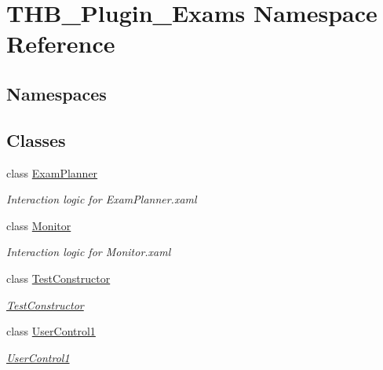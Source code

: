 \hypertarget{namespace_t_h_b___plugin___exams}{}\section{T\+H\+B\+\_\+\+Plugin\+\_\+\+Exams Namespace Reference}
\label{namespace_t_h_b___plugin___exams}
\subsection*{Namespaces}
\begin{DoxyCompactItemize}
\end{DoxyCompactItemize}
\subsection*{Classes}
\begin{DoxyCompactItemize}
\item 
class \mbox{\hyperlink{class_t_h_b___plugin___exams_1_1_exam_planner}{Exam\+Planner}}
\begin{DoxyCompactList}\small\item\em Interaction logic for Exam\+Planner.\+xaml \end{DoxyCompactList}\item 
class \mbox{\hyperlink{class_t_h_b___plugin___exams_1_1_monitor}{Monitor}}
\begin{DoxyCompactList}\small\item\em Interaction logic for Monitor.\+xaml \end{DoxyCompactList}\item 
class \mbox{\hyperlink{class_t_h_b___plugin___exams_1_1_test_constructor}{Test\+Constructor}}
\begin{DoxyCompactList}\small\item\em \mbox{\hyperlink{class_t_h_b___plugin___exams_1_1_test_constructor}{Test\+Constructor}} \end{DoxyCompactList}\item 
class \mbox{\hyperlink{class_t_h_b___plugin___exams_1_1_user_control1}{User\+Control1}}
\begin{DoxyCompactList}\small\item\em \mbox{\hyperlink{class_t_h_b___plugin___exams_1_1_user_control1}{User\+Control1}} \end{DoxyCompactList}\end{DoxyCompactItemize}
